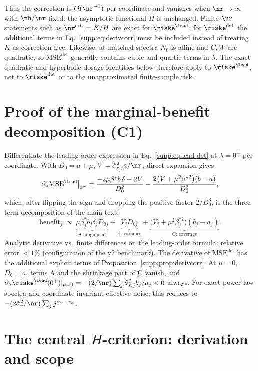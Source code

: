 Thus the correction is $O(\nr^{-1})$ per coordinate and vanishes when $\nr\to\infty$ with $\nh/\nr$ fixed: the asymptotic functional $H$ is unchanged.
Finite-$\nr$ statements such as $\nr^{\mathrm{crit}}=K/H$ are exact for $\riske^{\lead}$; for $\riske^{\det}$ the additional terms in Eq.~\eqref{supp:eq:derivcorr} must be included instead of treating $K$ as correction-free.
Likewise, at matched spectra $N_0$ is affine and $C,W$ are quadratic, so $\mathrm{MSE}^{\det}$ generally contains cubic and quartic terms in $\lambda$.
The exact quadratic and hyperbolic dosage identities below therefore apply to $\riske^{\lead}$, not to $\riske^{\det}$ or to the unapproximated finite-sample risk.

\section{Proof of the marginal-benefit decomposition (C1)}
\label{supp:c1}

Differentiate the leading-order expression in Eq.~\eqref{supp:eq:lead-det} at $\lambda = 0^+$ per coordinate.
With $D_0 = a + \mu$, $V = \tilde\sigma_{r,j}^2 a/\nr$, direct expansion gives
\begin{equation}
  \partial_\lambda \mathrm{MSE}^{\lead}\big|_{0^+} = \frac{-2\mu\beta^* b\, \delta - 2V}{D_0^2} - \frac{2\big(V + \mu^2\beta^{*2}\big)(b - a)}{D_0^3},
  \label{supp:eq:c1deriv}
\end{equation}
which, after flipping the sign and dropping the positive factor $2/D_0^3$, is the three-term decomposition of the main text:
\begin{equation}
  \mathrm{benefit}_j \;\propto\; \underbrace{\mu\beta^*_j b_j \delta_j D_{0j}}_{\text{A: alignment}} + \underbrace{V_j D_{0j}}_{\text{B: variance}} + \underbrace{\big(V_j + \mu^2\beta_j^{*2}\big)(b_j - a_j)}_{\text{C: coverage}} .
  \label{supp:eq:c1}
\end{equation}
Analytic derivative vs.\ finite differences on the leading-order formula: relative error $<1\%$ (configuration of the v2 benchmark).
The derivative of $\mathrm{MSE}^{\det}$ has the additional explicit terms of Proposition~\ref{supp:prop:derivcorr}.
At $\mu = 0$, $D_0 = a$, terms A and the shrinkage part of C vanish, and
$\partial_\lambda\riske^{\lead}(0^+)|_{\mu=0} = -(2/\nr)\sum_j \tilde\sigma_{r,j}^2 b_j/a_j < 0$ always. For exact power-law spectra and coordinate-invariant effective noise, this reduces to $-(2\tilde\sigma_r^2/\nr)\sum_j j^{\alpha_r-\alpha_h}$.

\section{The central $H$-criterion: derivation and scope}
\label{supp:h}

